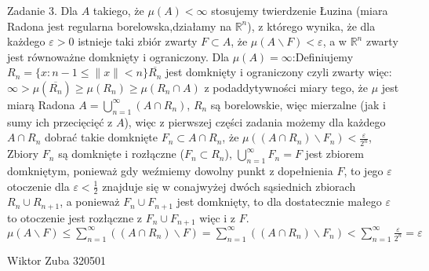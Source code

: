 \documentclass{article}
\begin{document}
Zadanie 3.
\newline
\newline
Dla $A$ takiego, że $\mu(A)<\infty$ stosujemy twierdzenie Łuzina (miara Radona jest regularna borelowska,działamy na $\mathbb{R}^n$),
z którego wynika, że dla każdego $\varepsilon>0$ istnieje taki zbiór zwarty $F\subset A$, że $\mu(A\backslash F)<\varepsilon$, a w $\mathbb{R}^n$
zwarty jest równoważne domknięty i ograniczony.\newline
Dla $\mu(A)=\infty$:\quad Definiujemy $R_n=\{x:n-1\le\lVert x\rVert<n\}$\quad $\overline{R_n}$ jest domknięty i ograniczony czyli zwarty więc:
$\infty>\mu(\overline{R_n})\ge\mu(R_n)\ge\mu(R_n\cap A)$ z podaddytywności miary tego, że $\mu$ jest miarą Radona\newline
$A=\bigcup\limits_{n=1}^{\infty}(A\cap R_n)$, $R_n$ są borelowskie, więc mierzalne (jak i sumy  ich przecięcięć z $A$), więc z pierwszej części zadania
możemy dla każdego $A\cap R_n$ dobrać takie domknięte $F_n\subset A\cap R_n$, że $\mu((A\cap R_n)\backslash F_n)<\frac{\varepsilon}{2^n}$, 
Zbiory $F_n$ są domknięte i rozłączne ($F_n\subset R_n$), $\bigcup\limits_{n=1}^{\infty} F_n=F$ jest zbiorem domkniętym,
ponieważ gdy weźmiemy dowolny punkt z dopełnienia $F$, to jego $\varepsilon$ otoczenie dla $\varepsilon<\frac{1}{2}$ znajduje się w conajwyżej dwóch sąsiednich
zbiorach $R_n\cup R_{n+1}$, a ponieważ $F_n\cup F_{n+1}$ jest domknięty, to dla dostatecznie małego $\varepsilon$ to otoczenie jest rozłączne z $F_n\cup F_{n+1}$
więc i z $F$.\newline
$\mu(A\backslash F)\le\sum\limits_{n=1}^{\infty}((A\cap R_n)\backslash F)=\sum\limits_{n=1}^{\infty}((A\cap R_n)\backslash F_n)<
\sum\limits_{n=1}^{\infty}\frac{\varepsilon}{2^n}=\varepsilon$\newpage

Wiktor Zuba 320501
\newline
\end{document}
